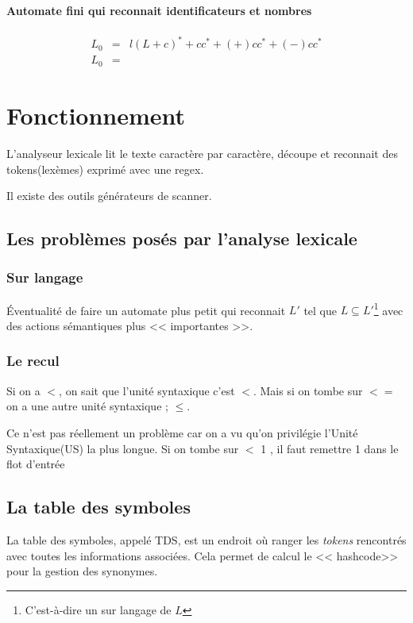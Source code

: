 \documentclass[12pt,a4paper,openany]{book}
\newcommand{\tokens}{\textit{tokens} }
\begin{document}
	\begin{exemple}
		\paragraph{Automate fini qui reconnait identificateurs et nombres}
		\begin{eqnarray*}
			L_0 &=&  l(L+c)^* + cc^* + (+) cc^* +(-)cc^*\\
			L_0 &=& 
		\end{eqnarray*}
	\end{exemple}

	\section{Fonctionnement}
	L'analyseur lexicale lit le texte caractère par caractère, découpe et reconnait des tokens(lexèmes) exprimé avec une regex.

	Il existe des outils générateurs de scanner.

	\subsection{Les problèmes posés par l'analyse lexicale}
	\subsubsection{Sur langage}
	Éventualité de faire un automate plus petit qui reconnait $L'$ tel que $L\subseteq L'$\footnote{C'est-à-dire un sur langage de $L$} avec des actions
	sémantiques plus << importantes >>.

	\subsubsection{Le recul}
	Si on a $<$, on sait que l’unité syntaxique c’est $<$. Mais si on tombe sur $<=$ on a une autre unité syntaxique ; $\leq$.

	Ce n'est pas réellement un problème car on a vu qu'on privilégie l'Unité Syntaxique(US) la plus longue.
	Si on tombe sur $<$ 1 , il faut remettre 1 dans le flot d’entrée

	\subsection{La table des symboles}
	La table des symboles, appelé TDS, est un endroit où ranger les \tokens rencontrés avec toutes les informations associées. Cela permet de calcul le <<
	hashcode>> pour la gestion des synonymes.
\end{document}
